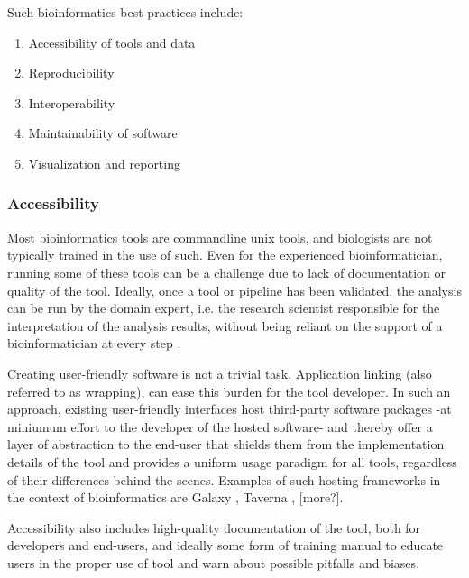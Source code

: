 Such bioinformatics best-practices include:

\begin{enumerate}
    \itemsep-0.5em
    \item Accessibility of tools and data %
    \item Reproducibility %
    \item Interoperability %
    \item Maintainability of software %
    \item Visualization and reporting
\end{enumerate}


\subsubsection{Accessibility}
Most bioinformatics tools are commandline unix tools, and biologists are not typically trained in the use of such. Even for the experienced bioinformatician, running some of these tools can be a challenge due to lack of documentation or quality of the tool. Ideally, once a tool or pipeline has been validated, the analysis can be run by the domain expert, i.e. the research scientist responsible for the interpretation of the analysis results, without being reliant on the support of a bioinformatician at every step \cite{kumar2007bioinformatics}.

Creating user-friendly software is not a trivial task. Application linking (also referred to as wrapping), can ease this burden for the tool developer. In such an approach, existing user-friendly interfaces host third-party software packages -at miniumum effort to the developer of the hosted software- and thereby offer a layer of abstraction to the end-user that shields them from the implementation details of the tool and provides a uniform usage paradigm for all tools, regardless of their differences behind the scenes. Examples of such hosting frameworks in the context of bioinformatics are Galaxy \cite{giardine2005galaxy,goecks2010galaxy}, Taverna \cite{}, [more?].

Accessibility also includes high-quality documentation of the tool, both for developers and end-users, and ideally some form of training manual to educate users in the proper use of tool and warn about possible pitfalls and biases.

